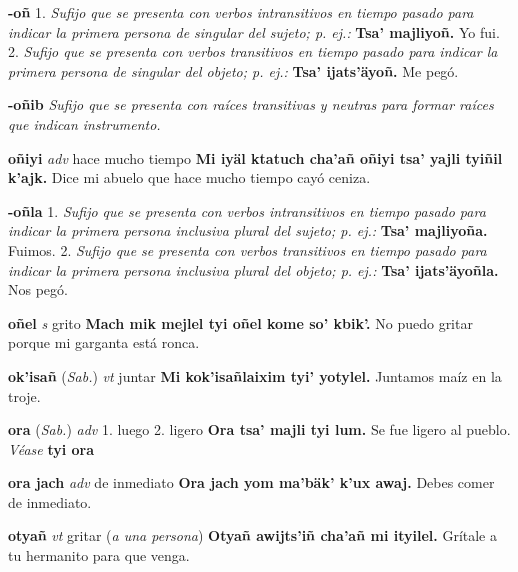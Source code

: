 \documentclass[10pt]{scrbook}
\newcommand{\entry}[1]{\textbf{#1}}
\newcommand{\onedefinition}[1]{#1.}
\newcommand{\nontranslationdef}[1]{\textit{#1}}
\newcommand{\partofspeech}[1]{\textit{#1}}
\newcommand{\spanishtranslation}[1]{#1}
\newcommand{\clarification}[1]{(\textit{#1})}
\newcommand{\cholexample}[1]{\textbf{#1}}
\newcommand{\exampletranslation}[1]{#1}
\newcommand{\alsosee}[1]{\\\textit{Véase} \textbf{#1}}
\newcommand{\relevantdialect}[1]{(\textit{#1})}
\begin{document}
\begin{multicols}{2}
\entry{-oñ}
\onedefinition{1}
\nontranslationdef{Sufijo que se presenta con verbos intransitivos en tiempo pasado para indicar la primera persona de singular del sujeto; p. ej.:}
\cholexample{Tsa' majliyoñ.}
\exampletranslation{Yo fui.}
\onedefinition{2}
\nontranslationdef{Sufijo que se presenta con verbos transitivos en tiempo pasado para indicar la primera persona de singular del objeto; p. ej.:}
\cholexample{Tsa' ijats'äyoñ.}
\exampletranslation{Me pegó.}

\entry{-oñib}
\nontranslationdef{Sufijo que se presenta con raíces transitivas y neutras para formar raíces que indican instrumento.}

\entry{oñiyi}
\partofspeech{adv}
\spanishtranslation{hace mucho tiempo}
\cholexample{Mi iyäl ktatuch cha'añ oñiyi tsa' yajli tyiñil k'ajk.}
\exampletranslation{Dice mi abuelo que hace mucho tiempo cayó ceniza.}

\entry{-oñla}
\onedefinition{1}
\nontranslationdef{Sufijo que se presenta con verbos intransitivos en tiempo pasado para indicar la primera persona inclusiva plural del sujeto; p. ej.:}
\cholexample{Tsa' majliyoña.}
\exampletranslation{Fuimos.}
\onedefinition{2}
\nontranslationdef{Sufijo que se presenta con verbos transitivos en tiempo pasado para indicar la primera persona inclusiva plural del objeto; p. ej.:}
\cholexample{Tsa' ijats'äyoñla.}
\exampletranslation{Nos pegó.}

\entry{oñel}
\partofspeech{s}
\spanishtranslation{grito}
\cholexample{Mach mik mejlel tyi oñel kome so' kbik'.}
\exampletranslation{No puedo gritar porque mi garganta está ronca.}

\entry{ok'isañ}
\relevantdialect{Sab.}
\partofspeech{vt}
\spanishtranslation{juntar}
\cholexample{Mi kok'isañlaixim tyi' yotylel.}
\exampletranslation{Juntamos maíz en la troje.}

\entry{ora}
\relevantdialect{Sab.}
\partofspeech{adv}
\onedefinition{1}
\spanishtranslation{luego}
\onedefinition{2}
\spanishtranslation{ligero}
\cholexample{Ora tsa' majli tyi lum.}
\exampletranslation{Se fue ligero al pueblo.}
\alsosee{tyi ora}

\entry{ora jach}
\partofspeech{adv}
\spanishtranslation{de inmediato}
\cholexample{Ora jach yom ma'bäk' k'ux awaj.}
\exampletranslation{Debes comer de inmediato.}

\entry{otyañ}
\partofspeech{vt}
\spanishtranslation{gritar}
\clarification{a una persona}
\cholexample{Otyañ awijts'iñ cha'añ mi ityilel.}
\exampletranslation{Grítale a tu hermanito para que venga.}


\end{multicols}
\end{document}
